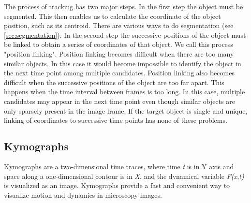 The process of tracking has two major steps. In the first step the
object must be segmented. This then enables us to calculate the
coordinate of the object position, such as its centroid. There are
various ways to do segmentation (see \ref{sec:segmentation}). 
In the second step the successive positions of the object must be linked to obtain a series of
coordinates of that object. We call this process "position linking". Position linking
becomes difficult when there are too many similar objects. In this case
it would become impossible to identify the object in the next time
point among multiple candidates. Position linking also becomes
difficult when the successive positions of the object are too far
apart. This happens when the time interval between frames is too long.
In this case, multiple candidates may appear in the next time point
even though similar objects are only sparsely present in the image
frame. If the target object is single and unique, linking of
coordinates to successive time points has none of these problems. 


\subsection{Kymographs }
\label{subsubsec:kymograph}

Kymographs are a two-dimensional time traces, where time \textit{t} is in Y axis and space along a one-dimensional contour is in \textit{X}, and the dynamical variable \textit{F(x,t) }is
visualized as an image. Kymographs provide a fast and convenient way to
visualize motion and dynamics in microscopy images.

